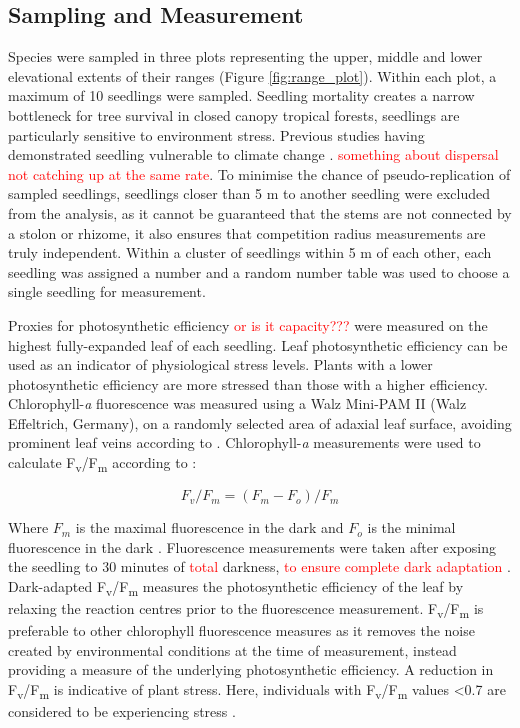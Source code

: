 \documentclass[a4paper,11pt]{article}
\newcommand{\todo}[1]{\textcolor{red}{#1}}   %
\begin{document}
\subsection*{Sampling and Measurement}
Species were sampled in three plots representing the upper, middle and lower elevational extents of their ranges (Figure \ref{fig:range_plot}). Within each plot, a maximum of 10 seedlings were sampled. Seedling mortality creates a narrow bottleneck for tree survival in closed canopy tropical forests, seedlings are particularly sensitive to environment stress. Previous studies having demonstrated seedling vulnerable to climate change \citep{REF}. \todo{something about dispersal not catching up at the same rate}. To minimise the chance of pseudo-replication of sampled seedlings, seedlings closer than 5 m to another seedling were excluded from the analysis, as it cannot be guaranteed that the stems are not connected by a stolon or rhizome, it also ensures that competition radius measurements are truly independent. Within a cluster of seedlings within 5 m of each other, each seedling was assigned a number and a random number table was used to choose a single seedling for measurement.

Proxies for photosynthetic efficiency \todo{or is it capacity???} were measured on the highest fully-expanded leaf of each seedling. Leaf photosynthetic efficiency can be used as an indicator of physiological stress levels. Plants with a lower photosynthetic efficiency are more stressed than those with a higher efficiency. Chlorophyll-\textit{a} fluorescence was measured using a Walz Mini-PAM II (Walz Effeltrich, Germany), on a randomly selected area of adaxial leaf surface, avoiding prominent leaf veins according to \citep{}. Chlorophyll-\textit{a} measurements were used to calculate F\textsubscript{v}/F\textsubscript{m} according to \citet{Genty1989}:

\begin{equation} \label{eq:fvfm}
F_v/F_m = (F_m - F_o)/F_m
\end{equation}

Where $F_m$ is the maximal fluorescence in the dark and $F_o$ is the minimal fluorescence in the dark \citep{Maxwell2000}. Fluorescence measurements were taken after exposing the seedling to 30 minutes of \todo{total} darkness, \todo{to ensure complete dark adaptation} \citep{Campbell2007}. Dark-adapted F\textsubscript{v}/F\textsubscript{m} measures the photosynthetic efficiency of the leaf by relaxing the reaction centres prior to the fluorescence measurement. F\textsubscript{v}/F\textsubscript{m} is preferable to other chlorophyll fluorescence measures as it removes the noise created by environmental conditions at the time of measurement, instead providing a measure of the underlying photosynthetic efficiency. A reduction in F\textsubscript{v}/F\textsubscript{m} is indicative of plant stress. Here, individuals with F\textsubscript{v}/F\textsubscript{m} values <0.7 are considered to be experiencing stress \citep{Maxwell2000}. 
\end{document}
